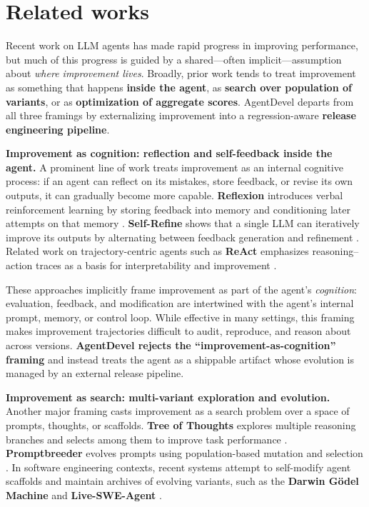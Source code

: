 \documentclass[11pt]{article}
\begin{document}
\section{Related works}
Recent work on LLM agents has made rapid progress in improving performance, but much of this progress is guided by a shared—often implicit—assumption about \textit{where improvement lives}. Broadly, prior work tends to treat improvement as something that happens \textbf{inside the agent}, as \textbf{search over population of variants}, or as \textbf{optimization of aggregate scores}. AgentDevel departs from all three framings by externalizing improvement into a regression-aware \textbf{release engineering pipeline}.

\textbf{Improvement as cognition: reflection and self-feedback inside the agent.} A prominent line of work treats improvement as an internal cognitive process: if an agent can reflect on its mistakes, store feedback, or revise its own outputs, it can gradually become more capable. \textbf{Reflexion} introduces verbal reinforcement learning by storing feedback into memory and conditioning later attempts on that memory \cite{shinn2023reflexion}. \textbf{Self-Refine} shows that a single LLM can iteratively improve its outputs by alternating between feedback generation and refinement \cite{madaan2023selfrefine}. Related work on trajectory-centric agents such as \textbf{ReAct} emphasizes reasoning–action traces as a basis for interpretability and improvement \cite{yao2022react}.

These approaches implicitly frame improvement as part of the agent’s \textit{cognition}: evaluation, feedback, and modification are intertwined with the agent’s internal prompt, memory, or control loop. While effective in many settings, this framing makes improvement trajectories difficult to audit, reproduce, and reason about across versions. \textbf{AgentDevel rejects the “improvement-as-cognition” framing} and instead treats the agent as a shippable artifact whose evolution is managed by an external release pipeline.

\textbf{Improvement as search: multi-variant exploration and evolution.} Another major framing casts improvement as a search problem over a space of prompts, thoughts, or scaffolds. \textbf{Tree of Thoughts} explores multiple reasoning branches and selects among them to improve task performance \cite{yao2023treeofthoughts}. \textbf{Promptbreeder} evolves prompts using population-based mutation and selection \cite{fernando2023promptbreeder}. In software engineering contexts, recent systems attempt to self-modify agent scaffolds and maintain archives of evolving variants, such as the \textbf{Darwin Gödel Machine} \cite{zhang2025darwingodel} and \textbf{Live-SWE-Agent} \cite{xia2025livesweagent}.
\end{document}

